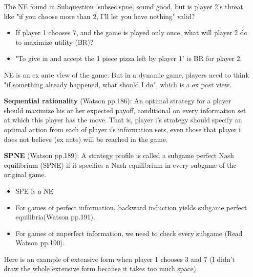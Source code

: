 \documentclass{article}
\begin{document}
\begin{mdframed}[backgroundcolor=blue!20,linecolor=white]

The NE found in Subquestion \ref{subsec:spne} sound good, but is player 2's threat like "if you choose more than 2, I'll let you have nothing" valid? 

\begin{itemize}
\item If player 1 chooses 7, and the game is played only once, what will player 2 do to maximize  utility (BR)?
\item "To give in and accept the 1 piece pizza left by player 1" is BR for player 2.
\end{itemize}

NE is an ex ante view of the game. But in a dynamic game, players need to think "if something already happened, what should I do", which is a ex post view.

\medskip

\textbf{Sequential rationality} (Watson pp.186): An optimal strategy for a player should maximize
his or her expected payoff, conditional on every information set
at which this player has the move. That is, player i’s strategy should
specify an optimal action from each of player i’s information sets, even
those that player i does not believe (ex ante) will be reached in the game.

\medskip

\textbf{SPNE} (Watson pp.189): A strategy profile is called a subgame perfect Nash equilibrium (SPNE) if it specifies a Nash equilibrium in every subgame of the original game.

\begin{itemize}
\item  SPE is a NE
\item  For games of perfect information,  backward induction yields subgame perfect equilibria(Watson pp.191).
\item  For games of imperfect information, we need to check every subgame (Read Watson pp.190).
\end{itemize}

Here is an example of extensive form when player 1 chooses 3 and 7 (I didn't draw the 
whole extensive form because it takes too much space).


\end{mdframed}
\end{document}

